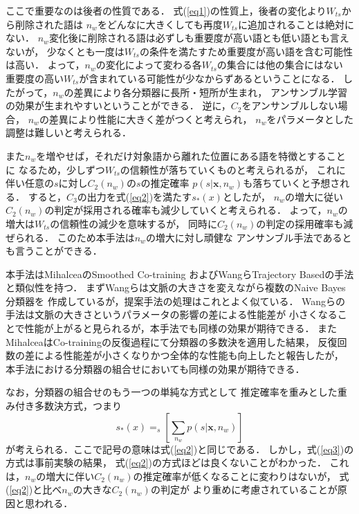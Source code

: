 \documentclass[japanese]{jnlp_1.4}
\newcommand{\argmax}{}
\begin{document}
ここで重要なのは後者の性質である．
式(\ref{eq1})の性質上，後者の変化より$W_{ts}$から削除された語は
$n_w$をどんなに大きくしても再度$W_{ts}$に追加されることは絶対にない．
$n_w$変化後に削除される語は必ずしも重要度が高い語とも低い語とも言えないが，
少なくとも一度は$W_{ts}$の条件を満たすため重要度が高い語を含む可能性は高い．
よって，$n_w$の変化によって変わる各$W_{ts}$の集合には他の集合にはない
重要度の高い$W_{ts}$が含まれている可能性が少なからずあるということになる．
したがって，$n_w$の差異により各分類器に長所・短所が生まれ，
アンサンブル学習の効果が生まれやすいということができる．
逆に，$C_2$をアンサンブルしない場合，
$n_w$の差異により性能に大きく差がつくと考えられ，
$n_w$をパラメータとした調整は難しいと考えられる．

また$n_w$を増やせば，それだけ対象語から離れた位置にある語を特徴とすることに
なるため，少しずつ$W_{ts}$の信頼性が落ちていくものと考えられるが，
これに伴い任意の$s$に対し$C_2(n_w)$の$s$の推定確率
$p(s|\mathbf{x},n_w)$も落ちていくと予想される．
すると，$C_3$の出力を式(\ref{eq2})を満たす$s_*(x)$としたが，
$n_w$の増大に従い$C_2(n_w)$の判定が採用される確率も減少していくと考えられる．
よって，$n_w$の増大は$W_{ts}$の信頼性の減少を意味するが，
同時に$C_2(n_w)$の判定の採用確率も減ぜられる．
このため本手法は$n_w$の増大に対し頑健な
アンサンブル手法であるとも言うことができる．

本手法はMihalceaのSmoothed Co-training \cite{Mihalcea04a}
およびWangらTrajectory Basedの手法\cite{Wang04}と類似性を持つ．
まずWangらは文脈の大きさを変えながら複数のNaive Bayes分類器を
作成しているが，提案手法の処理はこれとよく似ている．
Wangらの手法は文脈の大きさというパラメータの影響の差による性能差が
小さくなることで性能が上がると見られるが，本手法でも同様の効果が期待できる．
またMihalceaはCo-trainingの反復過程にて分類器の多数決を適用した結果，
反復回数の差による性能差が小さくなりかつ全体的な性能も向上したと報告したが，
本手法における分類器の組合せにおいても同様の効果が期待できる．

なお，分類器の組合せのもう一つの単純な方式として
推定確率を重みとした重み付き多数決方式，つまり
\begin{equation}
s_*(x)=\argmax_{s} \left[ \sum_{n_w}p(s|\mathbf{x},n_w) \right]
\label{eq3}
\end{equation}
が考えられる．ここで記号の意味は式(\ref{eq2})と同じである．
しかし，式(\ref{eq3})の方式は事前実験の結果，
式(\ref{eq2})の方式ほどは良くないことがわかった．
これは，$n_w$の増大に伴い$C_2(n_w)$の推定確率が低くなることに変わりはないが，
式(\ref{eq2})と比べ$n_w$の大きな$C_2(n_w)$の判定が
より重めに考慮されていることが原因と思われる．
\end{document}
